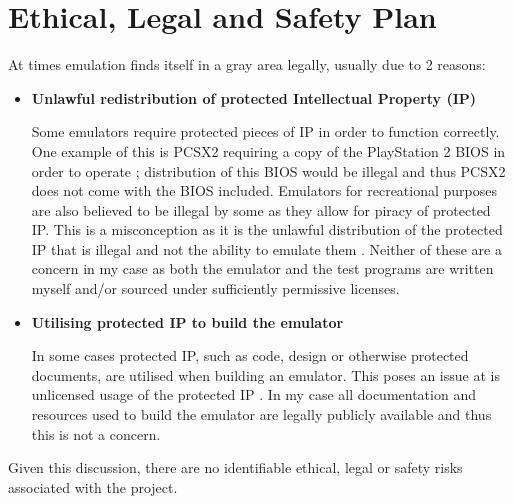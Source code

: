 \section{Ethical, Legal and Safety Plan}

At times emulation finds itself in a gray area legally, usually due to 2 reasons:

\begin{itemize}
    \item \textbf{Unlawful redistribution of protected Intellectual Property (IP)} %
    
    Some emulators require protected pieces of IP in order to function correctly. One example of this is PCSX2 requiring a copy of the PlayStation 2 BIOS in order to operate \cite{PCSX2-getting-started}; distribution of this BIOS would be illegal and thus PCSX2 does not come with the BIOS included. Emulators for recreational purposes are also believed to be illegal by some as they allow for piracy of protected IP. This is a misconception as it is the unlawful distribution of the protected IP that is illegal and not the ability to emulate them \cite{nintendo-court-case, sega-court-case, sony-court-case}. Neither of these are a concern in my case as both the emulator and the test programs are written myself and/or sourced under sufficiently permissive licenses.

    \item \textbf{Utilising protected IP to build the emulator} %
    
    In some cases protected IP, such as code, design or otherwise protected documents, are utilised when building an emulator. This poses an issue at is unlicensed usage of the protected IP \cite{nintendo-source-leak}. In my case all documentation and resources used to build the emulator are legally publicly available and thus this is not a concern.
\end{itemize}

Given this discussion, there are no identifiable ethical, legal or safety risks associated with the project.